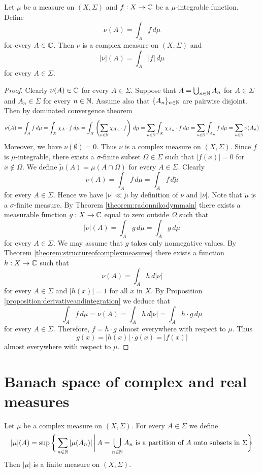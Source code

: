 \begin{corollary}\label{corollary:totalvariationofcontinuousmeasure}
Let $\mu$ be a measure on $(X,\Sigma)$ and $f:X\rightarrow {\mathbb C}$ be a $\mu$-integrable function. Define
$$\nu(A) = \int_Af\,d\mu$$
for every $A\in {\mathbb C}$. Then $\nu$ is a complex measure on $(X,\Sigma)$ and
$$|\nu|(A) = \int_A|f|\,d\mu$$
for every $A\in \Sigma$.
\end{corollary}
\begin{proof}
Clearly $\nu(A)\in {\mathbb C}$ for every $A\in \Sigma$. Suppose that $A = \bigcup_{n\in {\mathbb N}}A_n$ for $A\in \Sigma$ and $A_n\in \Sigma$ for every $n\in {\mathbb N}$. Assume also that $\{A_n\}_{n\in {\mathbb N}}$ are pairwise disjoint. Then by dominated convergence theorem
$$\nu(A) = \int_A f\,d\mu = \int_X\chi_A\cdot f\,d\mu = \int_X\left(\sum_{n\in {\mathbb N}}\chi_{A_n}\cdot f\right)\,d\mu = \sum_{n\in {\mathbb N}}\int_X\chi_{A_n}\cdot f\,d\mu = \sum_{n\in {\mathbb N}}\int_{A_n}f\,d\mu = \sum_{n\in {\mathbb N}}\nu(A_n)$$
Moreover, we have $\nu(\emptyset) = 0$. Thus $\nu$ is a complex measure on $(X,\Sigma)$. Since $f$ is $\mu$-integrable, there exists a $\sigma$-finite subset $\Omega\in \Sigma$ such that $|f(x)|= 0$ for $x\not \in \Omega$. We define $\tilde{\mu}(A) = \mu(A\cap \Omega)$ for every $A\in \Sigma$. Clearly
$$\nu(A) = \int_Af\,d\mu = \int_Af\,d\tilde{\mu}$$
for every $A\in \Sigma$. Hence we have $|\nu|\ll\tilde{\mu}$ by definition of $\nu$ and $|\nu|$. Note that $\tilde{\mu}$ is a $\sigma$-finite measure. By Theorem \ref{theorem:radonnikodymmain} there exists a measurable function $g:X\rightarrow {\mathbb C}$ equal to zero outside $\Omega$ such that
$$|\nu|(A) = \int_Ag\,d\tilde{\mu} = \int_Ag\,d\mu$$
for every $A\in \Sigma$. We may assume that $g$ takes only nonnegative values. By Theorem \ref{theorem:structureofcomplexmeasures} there exists a function $h:X\rightarrow {\mathbb C}$ such that
$$\nu(A) = \int_Ah\,d|\nu|$$
for every $A\in \Sigma$ and $|h(x)|=1$ for all $x$ in $X$. By Proposition \ref{proposition:derivativeandintegration} we deduce that
$$\int_Af\,d\mu = \nu(A) = \int_Ah\,d|\nu| = \int_Ah\cdot g\,d\mu$$
for every $A\in \Sigma$. Therefore, $f = h\cdot g$ almost everywhere with respect to $\mu$. Thus
$$g(x) = |h(x)|\cdot g(x) = |f(x)|$$
almost everywhere with respect to $\mu$.
\end{proof}

\section{Banach space of complex and real measures}

\begin{proposition}
Let $\mu$ be a complex measure on $(X,\Sigma)$. For every $A\in \Sigma$ we define
$$|\mu|(A) = \sup \bigg\{\sum_{n\in {\mathbb N}}|\mu(A_n)|\,\bigg|\,A = \bigcup_{n\in {\mathbb N}}A_n\mbox{ is a partition of }A\mbox{ onto subsets in }\Sigma\bigg\}$$
Then $|\mu|$ is a finite measure on $(X,\Sigma)$.
\end{proposition}





\small



